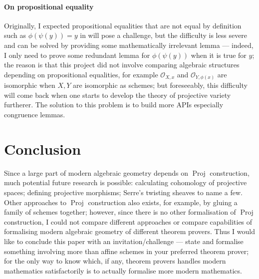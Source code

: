 \documentclass[a4paper,UKenglish,cleveref, autoref, thm-restate]{lipics-v2021}
\begin{document}
\paragraph*{On propositional equality}
Originally, I expected propositional equalities that are not equal by definition such as $\phi(\psi(y)) = y$ in  will pose a challenge, but the difficulty is less severe and can be solved by providing some mathematically irrelevant lemma --- indeed, I only need to prove some redundant lemma for $\phi(\psi(y))$ when it is true for $y$; the reason is that this project did not involve comparing algebraic structures depending on propositional equalities, for example $\mathcal{O}_{X, x}$ and $\mathcal{O}_{Y, \phi(x)}$ are isomorphic when $X, Y$ are isomorphic as schemes; but foreseeably, this difficulty will come back when one starts to develop the theory of projective variety furtherer. The solution to this problem is to build more APIs especially congruence lemmas.

\section{Conclusion} 

Since a large part of modern algebraic geometry depends on $\operatorname{Proj}$ construction, much potential future research is possible: calculating cohomology of projective spaces; defining projective morphisms; Serre's twisting sheaves to name a few. Other approaches to $\operatorname{Proj}$ construction also exists, for example, by gluing a family of schemes together; however, since there is no other formalisation of $\operatorname{Proj}$ construction, I could not compare different approaches or compare capabilities of formalising modern algebraic geometry of different theorem provers. Thus I would like to conclude this paper with an invitation/challenge --- state and formalise something involving more than affine schemes in your preferred theorem prover; for the only way to know which, if any, theorem provers handles modern mathematics satisfactorily is to actually formalise more modern mathematics.


\end{document}

